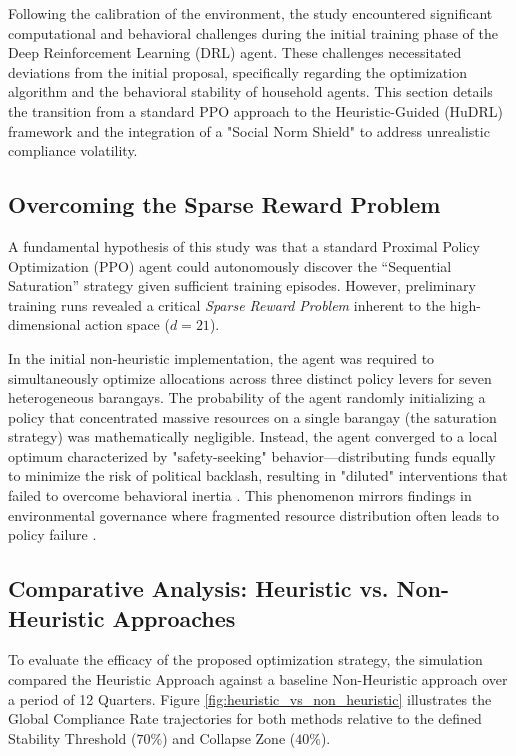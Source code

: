 
Following the calibration of the environment, the study encountered significant computational and behavioral challenges during the initial training phase of the Deep Reinforcement Learning (DRL) agent. These challenges necessitated deviations from the initial proposal, specifically regarding the optimization algorithm and the behavioral stability of household agents. This section details the transition from a standard PPO approach to the Heuristic-Guided (HuDRL) framework and the integration of a "Social Norm Shield" to address unrealistic compliance volatility.

\subsection{Overcoming the Sparse Reward Problem}

A fundamental hypothesis of this study was that a standard Proximal Policy Optimization (PPO) agent could autonomously discover the ``Sequential Saturation'' strategy given sufficient training episodes. However, preliminary training runs revealed a critical \textit{Sparse Reward Problem} inherent to the high-dimensional action space ($d=21$).

In the initial non-heuristic implementation, the agent was required to simultaneously optimize allocations across three distinct policy levers for seven heterogeneous barangays. The probability of the agent randomly initializing a policy that concentrated massive resources on a single barangay (the saturation strategy) was mathematically negligible. Instead, the agent converged to a local optimum characterized by "safety-seeking" behavior—distributing funds equally to minimize the risk of political backlash, resulting in "diluted" interventions that failed to overcome behavioral inertia \citep{ZhengAI2022}. This phenomenon mirrors findings in environmental governance where fragmented resource distribution often leads to policy failure \citep{Villanueva2021}.

\subsection{Comparative Analysis: Heuristic vs. Non-Heuristic Approaches}

To evaluate the efficacy of the proposed optimization strategy, the simulation compared the Heuristic Approach against a baseline Non-Heuristic approach over a period of 12 Quarters. Figure \ref{fig:heuristic_vs_non_heuristic} illustrates the Global Compliance Rate trajectories for both methods relative to the defined Stability Threshold ($70\%$) and Collapse Zone ($40\%$).

